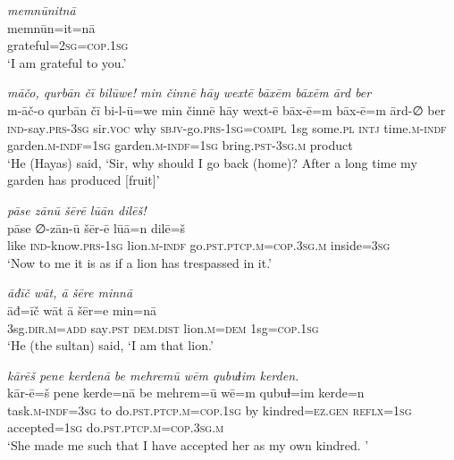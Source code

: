\ea \label{ŽH.105}
\textit{memnūnitnā} \\ 
\gll memnūn=it=nā \\ 
 grateful\textsc{=\textsc{2sg}}\textsc{=cop}\textsc{.1sg} \\ 
\glt `I am grateful to you.'
\z 
 
\ea \label{ŽH.113}
\textit{māčo, qurbān čī bilūwe! min činnē hāy wextē bāxēm bāxēm ārd ber} \\ 
\gll m-āč-o qurbān čī bi-l-ū=we min činnē hāy wext-ē bāx-ē=m bāx-ē=m ārd-∅ ber \\ 
 \textsc{ind-}say\textsc{.prs}\textsc{-3sg} sir.\textsc{voc} why \textsc{sbjv-}go\textsc{.prs}\textsc{-1sg}\textsc{=compl} 1sg some\textsc{.pl} \textsc{intj} time\textsc{.m}\textsc{-indf} garden\textsc{.m}\textsc{-indf}\textsc{=1sg} garden\textsc{.m}\textsc{-indf}\textsc{=1sg} bring\textsc{.pst}\textsc{-3sg}\textsc{.m} product \\ 
\glt `He (Hayas) said, ‘Sir, why should I go back (home)? After a long time my garden has produced [fruit]'
\z 
 
\ea \label{ŽH.114}
\textit{pāse zānū šērē lūān dilēš!} \\ 
\gll pāse ∅-zān-ū šēr-ē lūā=n dilē=š \\ 
 like \textsc{ind-}know\textsc{.prs}\textsc{-1sg} lion\textsc{.m}\textsc{-indf} go\textsc{.pst}\textsc{.ptcp}\textsc{.m}\textsc{=cop}\textsc{.3sg}\textsc{.m} inside\textsc{=3sg} \\ 
\glt `Now to me it is as if a lion has trespassed in it.'
\z 
 
\ea \label{ŽH.116}
\textit{āđīč wāt, ā šēre minnā} \\ 
\gll āđ=īč wāt ā šēr=e min=nā \\ 
 3sg\textsc{.dir}\textsc{.m}\textsc{=add} say\textsc{.pst} \textsc{dem.dist} lion\textsc{.m}\textsc{=dem} 1sg\textsc{=cop}\textsc{.1sg} \\ 
\glt `He (the sultan) said, ‘I am that lion.'
\z 
 
\ea \label{ŽH.117}
\textit{kārēš pene kerdenā be mehremū wēm qubuɫim kerden.} \\ 
\gll kār-ē=š pene kerde=nā be mehrem=ū wē=m qubuɫ=im kerde=n \\ 
 task\textsc{.m}\textsc{-indf}\textsc{=3sg} to do\textsc{.pst}\textsc{.ptcp}\textsc{.m}\textsc{=cop}\textsc{.1sg} by kindred\textsc{=ez}\textsc{.gen} \textsc{reflx}\textsc{=1sg} accepted\textsc{=1sg} do\textsc{.pst}\textsc{.ptcp}\textsc{.m}\textsc{=cop}\textsc{.3sg}\textsc{.m} \\ 
\glt `She made  me such that I have accepted her as my own kindred. '
\z 
 
